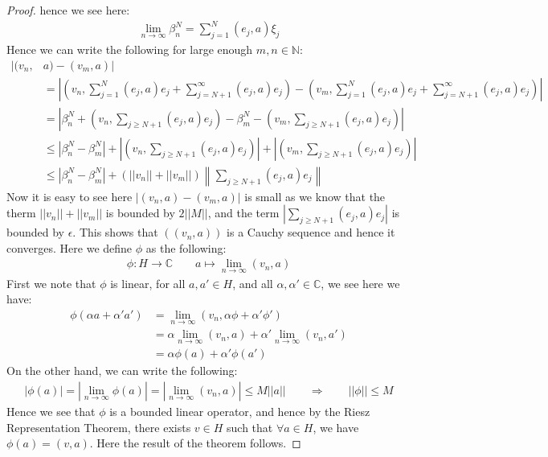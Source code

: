 \documentclass[11pt]{book}
\theoremstyle{break}
\theoremstyle{break}
\newcommand{\N}{\mathbb{N}}
\newcommand{\C}{\mathbb{C}}
\begin{document}
\begin{proof}
hence we see here:
\begin{align*}
\lim_{n\to \infty} \beta_n^N = \sum_{j=1}^N (e_j, a) \xi_j
\end{align*}
Hence we can write the following for large enough $m,n \in \N$:
\begin{align*}
|(v_n,&a) - (v_m,a)| \\
&= \left|\left(v_n, \sum_{j=1}^N(e_j,a)e_j + \sum_{j= N+1}^\infty (e_j,a)e_j\right)-\left( v_m, \sum_{j=1}^N(e_j,a)e_j + \sum_{j=N+1}^\infty (e_j, a) e_j\right) \right|\\
&=\left| \beta_n^N + \left(v_n, \sum_{j\geq N+1}(e_j,a) e_j\right) - \beta_m^N -\left(v_m, \sum_{j\geq N+1}(e_j,a)e_j\right) \right|\\
&\leq \left|\beta_n^N - \beta_m^N\right| + \left|\left(v_n, \sum_{j\geq N+1}(e_j, a) e_j\right)\right|+ \left|\left(v_m, \sum_{j\geq N+1}(e_j, a) e_j\right)\right|\\
&\leq \left|\beta_n^N - \beta_m^N\right| + (||v_n|| + ||v_m||)\left\|\sum_{j\geq N+1}(e_j, a)e_j \right\|
\end{align*}
Now it is easy to see here $|(v_n,a) - (v_m,a)|$ is small as we know that the therm $||v_n|| + ||v_m||$ is bounded by $2||M||$, and the term $|\sum_{j\geq N+1}(e_j, a)e_j |$ is bounded by $\epsilon$. This shows that $((v_n,a))$ is a Cauchy sequence and hence it converges. Here we define $\phi$ as the following:
\begin{align*}
\phi:H \to \C\qquad a\mapsto \lim_{n \to \infty}(v_n, a)
\end{align*}
First we note that $\phi$ is linear, for all $a,a'\in H$, and all $\alpha,\alpha'\in \C$, we see here we have:
\begin{align*}
\phi(\alpha a+ \alpha' a') &= \lim_{n\to \infty}(v_n, \alpha \phi+\alpha'\phi')\\
&= \alpha \lim_{n\to \infty}(v_n, a) + \alpha'\lim_{n\to \infty}(v_n, a')\\
&= \alpha\phi(a) + \alpha'\phi(a')
\end{align*}
On the other hand, we can write the following:
\begin{align*}
|\phi(a)| = \left|\lim_{n\to \infty}\phi(a)\right| =\left|\lim_{n\to \infty}(v_n, a)\right| \leq M||a|| \qquad \Rightarrow \qquad ||\phi|| \leq M
\end{align*}
Hence we see that $\phi$ is a bounded linear operator, and hence by the Riesz Representation Theorem, there exists $v \in H$ such that $\forall a \in H$, we have $\phi(a) = (v,a)$. Here the result of the theorem follows. 
\end{proof}
\end{document}
